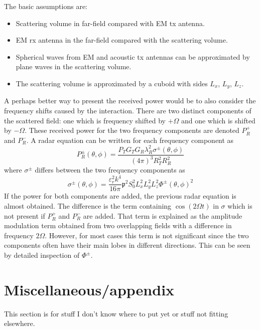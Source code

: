 \documentclass[10pt,a4paper,draft]{scrartcl}
\begin{document}
	The basic assumptions are:
	\begin{itemize}
		\item Scattering volume in far-field compared with EM tx antenna.
		\item EM rx antenna in the far-field compared with the scattering volume.
		\item Spherical waves from EM and acoustic tx antennas can be approximated by plane waves in the scattering volume.
		\item The scattering volume is approximated by a cuboid with sides $L_x$, $L_y$, $L_z$.
	\end{itemize}
	
	A perhaps better way to present the received power would be to also consider the frequency shifts caused by the interaction. There are two distinct components of the scattered field: one which is frequency shifted by $+\Omega$ and one which is shifted by $-\Omega$. These received power for the two frequency components are denoted $P_R^+$ and $P_R^-$. A radar equation can be written for each frequency component as
	\begin{equation*}
	P_R^\pm(\theta,\phi) = \frac{P_T G_T G_R \lambda_R^2 \sigma^\pm(\theta,\phi)}{(4\pi)^3 R_T^2 R_R^2}
	\end{equation*}
	where $\sigma^\pm$ differs between the two frequency components as
	\begin{equation*}
	\sigma^\pm(\theta,\phi) = \frac{\varepsilon_r^2 k^4}{16\pi} \mathfrak{p}^2 S_0^2 L_x^2 L_y^2 L_z^2 \Phi^\pm(\theta,\phi)^2
	\end{equation*}
	If the power for both components are added, the previous radar equation is almost obtained. The difference is the term containing $\cos(2\Omega t)$ in $\sigma$ which is not present if $P_R^+$ and $P_R^-$ are added. That term is explained as the amplitude modulation term obtained from two overlapping fields with a difference in frequency $2\Omega$. However, for most cases this term is not significant since the two components often have their main lobes in different directions. This can be seen by detailed inspection of $\Phi^\pm$.
	
	\section{Miscellaneous/appendix}
	This section is for stuff I don't know where to put yet or stuff not fitting elsewhere.
	
\end{document}
